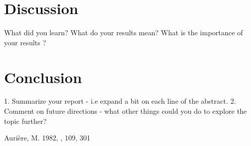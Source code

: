 \documentclass[iop]{emulateapj}
\begin{document}
\section{Discussion}

    What did you learn? What do your results mean? What is the importance of your results ?

\section{Conclusion}

    1. Summarize your report - i.e expand a bit on each line of the abstract.
    2. Comment on future directions - what other things could you do to explore the topic further?

\begin{thebibliography}{}

     Auri\`ere, M.  1982, \aap,
        109, 301
    
\end{thebibliography}

\clearpage
\end{document}

